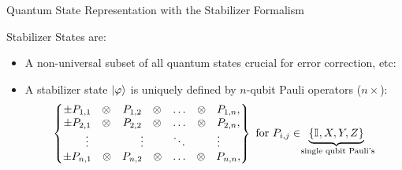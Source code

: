 \begin{frame}{Quantum State Representation with the
					\alert{Stabilizer Formalism}}


\begin{definition}
Stabilizer States are:

\begin{itemize} 
	\item
A non-universal subset of all quantum states crucial for error correction, etc: 

\begin{center}
\end{center}

\pause

\item A stabilizer state $\ket{\varphi}$ is uniquely defined by 
			$n$-qubit Pauli operators ($n \times$):
\[
\left\{
\begin{matrix}
\pm P_{1,1}~~~ \otimes & P_{1,2}~~~ \otimes & \dots & \otimes~~~ P_{1,n},\\
\pm P_{2,1}~~~ \otimes& P_{2,2}~~~  \otimes& \dots & \otimes~~~ P_{2,n},\\
\vdots  & \vdots  & \ddots& \vdots\\
\pm P_{n,1}~~~ \otimes& P_{n,2}~~~ \otimes & \dots &  \otimes~~~ P_{n,n},\\
\end{matrix} 
\right\}
\text{ for } P_{i,j} \in \hspace{-.5em} \underbrace{\left\lbrace \mathbb{I}_{}, X, Y, Z \right\rbrace}_{ \text{ single qubit Pauli's}}
\]	
\pause


\end{itemize}
\end{definition}
\end{frame}

